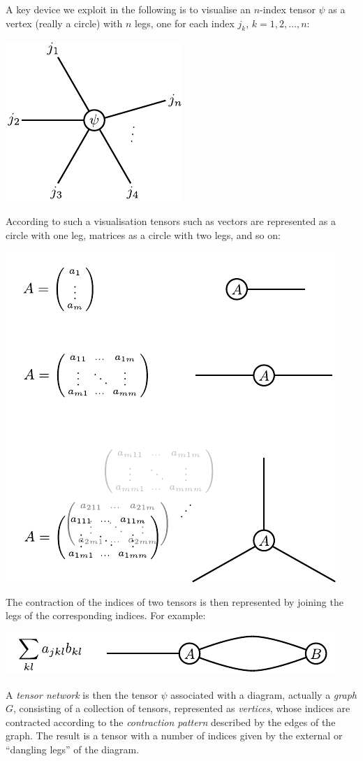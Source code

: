\documentclass[prl,twocolumn,lengthcheck,superscriptaddress]{revtex4-1}
\theoremstyle{definition}
\theoremstyle{remark}
\begin{document}
A key device we exploit in the following is to visualise an $n$-index tensor $\psi$ as a vertex (really a circle) with $n$ legs, one for each index $j_k$, $k = 1, 2, \ldots, n$:
\begin{center}
\includegraphics{psitns.pdf}
\end{center}
According to such a visualisation tensors such as vectors are represented as a circle with one leg, matrices as a circle with two legs, and so on:
\begin{center}
\includegraphics{tns1.pdf}
\end{center}
The contraction of the indices of two tensors is then represented by joining the legs of the corresponding indices. For example:
\begin{center}
\includegraphics{tns2.pdf}
\end{center}
A \emph{tensor network} is then the tensor $\psi$ associated with a diagram, actually a \emph{graph} $G$, consisting of a collection of tensors, represented as \emph{vertices}, whose indices are contracted according to the \emph{contraction pattern} described by the edges of the graph. The result is a tensor with a number of indices given by the external or ``dangling legs'' of the diagram. 
\end{document}

